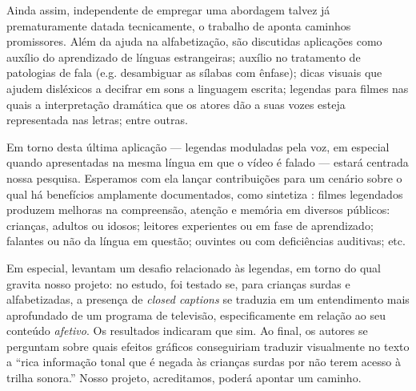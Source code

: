 \documentclass[a4paper,11pt,titlepage,singlespacing]{article}
\begin{document}
    
    Ainda assim, independente de empregar uma abordagem talvez já prematuramente datada tecnicamente, o trabalho de  aponta caminhos promissores. Além da ajuda na alfabetização, são discutidas aplicações como auxílio do aprendizado de línguas estrangeiras; auxílio no tratamento de patologias de fala (e.g. desambiguar as sílabas com ênfase); dicas visuais que ajudem disléxicos a decifrar em sons a linguagem escrita; legendas para filmes nas quais a interpretação dramática que os atores dão a suas vozes esteja representada nas letras; entre outras.


Em torno desta última aplicação — legendas moduladas pela voz, em especial quando apresentadas na mesma língua em que o vídeo é falado — estará centrada nossa pesquisa. Esperamos com ela lançar contribuições para um cenário sobre o qual há benefícios amplamente documentados, como sintetiza : filmes legendados produzem melhoras na compreensão, atenção e memória em diversos públicos: crianças, adultos ou idosos; leitores experientes ou em fase de aprendizado; falantes ou não da língua em questão; ouvintes ou com deficiências auditivas; etc.
    
    
    
    Em especial,  levantam um desafio relacionado às legendas, em torno do qual gravita nosso projeto: no estudo, foi testado se, para crianças surdas e alfabetizadas, a presença de \textit{closed captions} se traduzia em um entendimento mais aprofundado de um programa de televisão, especificamente em relação ao seu conteúdo \textit{afetivo}. Os resultados indicaram que sim. Ao final, os autores se perguntam sobre quais efeitos gráficos conseguiriam traduzir visualmente no texto a ``rica informação tonal que é negada às crianças surdas por não terem acesso à trilha sonora.'' Nosso projeto, acreditamos, poderá apontar um caminho.
\end{document}
